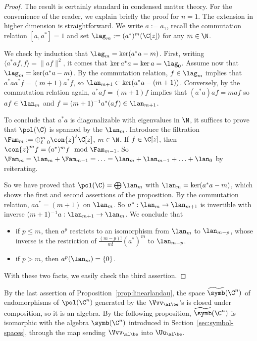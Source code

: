 \begin{proof}
The result is certainly standard in condensed matter theory. For the convenience of the reader, we explain briefly the proof
for $n=1$. The extension in higher dimension is straightforward. We write $a:= a_1$, recall the commutation relation $ [a, a^{*}]= 1 $ and set $\lag_m := (a^{*})^m (\C[z])$ for any $m \in \N$.

We check by induction that $\lag_m = \ker (a^* a - m)$. First, writing $\langle a^{*} a f, f \rangle = \| a f \|^2 $, it comes that $\ker a^* a = \ker a =
\lag_0$. Assume now that $\lag_m = \ker (a^* a - m)$. By the commutation relation, $f \in \lag_m$ implies that $a^{*} a a ^{*} f = (m+1) a^* f$, so $\lan_{m+1} \subset \ker (a^* a - (m+1))$. Conversely, by the commutation relation again, $a^* a f = (m+1) f $ implies that $ (a^* a) a f = m a f$ so $ af \in \lan_m$ and $f = (m+1)^{-1} a^* (af) \in
\lan_{m+1}$.

To conclude that $a^* a $ is diagonalizable with eigenvalues in $\N$, it suffices to prove that $\pol (\C)$ is spanned by the $\lan_m$. Introduce the filtration $\Fam_m := \oplus _{\ell=0}^{m} \con{z}^\ell
\C[z]$, $m \in \N$. If $f \in \C [z]$, then $\con{z}^m f = (a^{*})^m f \mod \Fam_{m-1}$. So $\Fam_m = \lan_m +
\Fam_{m-1} = \ldots = \lan_m + \lan_{m-1} + \ldots + \lan_0$ by reiterating.

So we have proved that $\pol (\C) = \bigoplus \lan_m$ with $\lan_m = \ker (a^* a - m)$, which shows the first and second assertions of the proposition. By the commutation relation, $a a^{*} = (m+1)$ on $\lan_m$. So $a^{*} : \lan_m \rightarrow \lan_{m+1}$ is invertible with inverse $(m+1)^{-1} a: \lan_{m+1} \rightarrow \lan_{m}$. We conclude that
\begin{itemize}
\item if $p \leqslant m$, then $a^p$ restricts to an isomorphism from $\lan_m$ to $\lan_{m-p}$, whose inverse is the restriction of $\frac{(m-p)!}{m!} (a^{*})^m$ to $\lan_{m-p}$.
\item if $p > m$, then $a ^p (\lan_m) = \{0\}$.
\end{itemize}
With these two facts, we easily check the third assertion.
\end{proof}

By the last assertion of Proposition~\ref{prop:linearlandau}, the space $\widetilde{\symb} (\C^n)$ of endomorphisms of $\pol (
\C^n)$ generated by the $\Vvv_{\al \be}$'s is closed under composition, so it is an algebra. By the following proposition, $\widetilde{\symb} (\C^n)$ is isomorphic with the algebra $\symb (\C^n)$ introduced in Section~\ref{sec:symbol-spaces}, through the map sending $\Vvv_{\al\be}$ into $\Uu_{\al\be}$.

